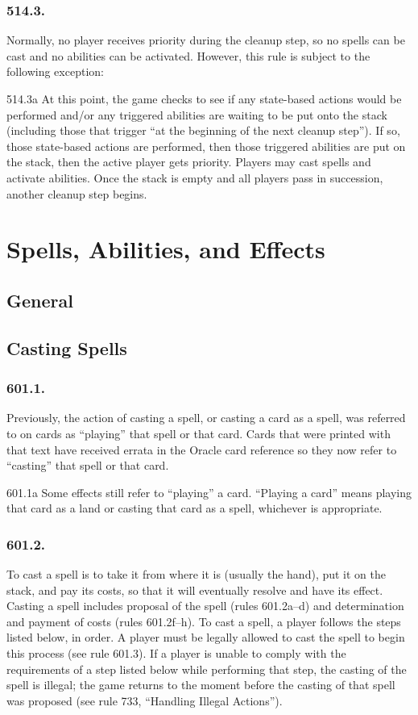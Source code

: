 \subsection*{514.3.}
Normally, no player receives priority during the cleanup step, so no spells can be cast and no abilities can be activated. However, this rule is subject to the following exception:

514.3a At this point, the game checks to see if any state-based actions would be performed and/or any triggered abilities are waiting to be put onto the stack (including those that trigger “at the beginning of the next cleanup step”). If so, those state-based actions are performed, then those triggered abilities are put on the stack, then the active player gets priority. Players may cast spells and activate abilities. Once the stack is empty and all players pass in succession, another cleanup step begins.

\chapter{Spells, Abilities, and Effects}
\setcounter{section}{599}
\section{General}

\section{Casting Spells}
\subsection*{601.1.}
Previously, the action of casting a spell, or casting a card as a spell, was referred to on cards as “playing” that spell or that card. Cards that were printed with that text have received errata in the Oracle card reference so they now refer to “casting” that spell or that card.

601.1a Some effects still refer to “playing” a card. “Playing a card” means playing that card as a land or casting that card as a spell, whichever is appropriate.

\subsection*{601.2.}
To cast a spell is to take it from where it is (usually the hand), put it on the stack, and pay its costs, so that it will eventually resolve and have its effect. Casting a spell includes proposal of the spell (rules 601.2a–d) and determination and payment of costs (rules 601.2f–h). To cast a spell, a player follows the steps listed below, in order. A player must be legally allowed to cast the spell to begin this process (see rule 601.3). If a player is unable to comply with the requirements of a step listed below while performing that step, the casting of the spell is illegal; the game returns to the moment before the casting of that spell was proposed (see rule 733, “Handling Illegal Actions”).

